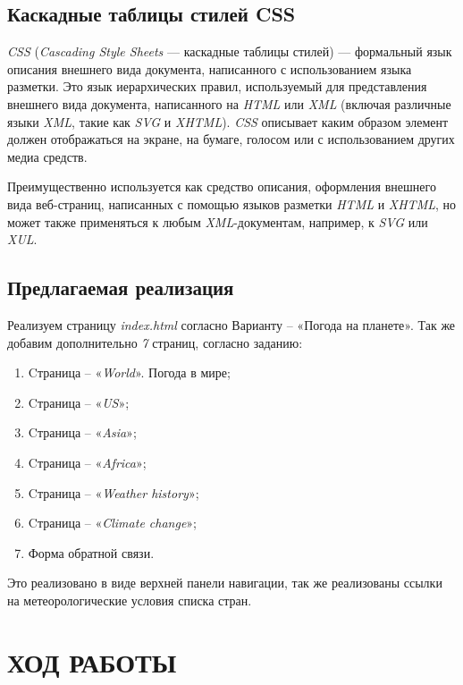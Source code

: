 \documentclass[a4paper,hidelinks,14pt]{extarticle}
\begin{document}
\subsection{Каскадные таблицы стилей CSS}
\textit{CSS} (\textit{Cascading Style Sheets }— каскадные таблицы стилей) — формальный язык описания внешнего вида документа, написанного с использованием языка разметки. Это язык иерархических правил, используемый для представления внешнего вида документа, написанного на \textit{HTML} или \textit{XML} (включая различные языки \textit{XML}, такие как \textit{SVG} и \textit{XHTML}). \textit{CSS} описывает каким образом элемент должен отображаться на экране, на бумаге, голосом или с использованием других медиа средств.

Преимущественно используется как средство описания, оформления внешнего вида веб-страниц, написанных с помощью языков разметки \textit{HTML} и \textit{XHTML}, но может также применяться к любым \textit{XML}-документам, например, к \textit{SVG} или \textit{XUL}.


\subsection{Предлагаемая реализация}
Реализуем страницу \textit{index.html} согласно Варианту -- «Погода на планете». Так же добавим дополнительно \textit{7} страниц, согласно заданию:
\begin{enumerate}
	\item Cтраница – «\textit{World}». Погода в мире;
   	\item Cтраница – «\textit{US}»;
    \item Cтраница – «\textit{Asia}»;
    \item Cтраница – «\textit{Africa}»;

    \item Cтраница – «\textit{Weather history}»;
    \item Cтраница – «\textit{Climate change}»;
    \item Форма обратной связи.
\end{enumerate}


Это реализовано в виде  верхней панели навигации, так же реализованы ссылки на метеорологические условия списка стран.


\section[Ход работы]{ХОД РАБОТЫ}
\end{document}
